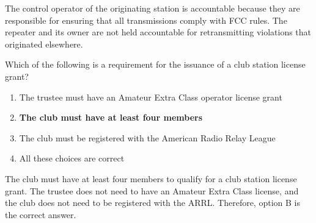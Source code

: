 The control operator of the originating station is accountable because they are responsible for ensuring that all transmissions comply with FCC rules. The repeater and its owner are not held accountable for retransmitting violations that originated elsewhere.

\begin{tcolorbox}[colback=gray!10!white,colframe=black!75!black,title={T1F11}]
    Which of the following is a requirement for the issuance of a club station license grant?
    \begin{enumerate}[label=\Alph*),noitemsep]
        \item The trustee must have an Amateur Extra Class operator license grant
        \item \textbf{The club must have at least four members}
        \item The club must be registered with the American Radio Relay League
        \item All these choices are correct
    \end{enumerate}
\end{tcolorbox}

The club must have at least four members to qualify for a club station license grant. The trustee does not need to have an Amateur Extra Class license, and the club does not need to be registered with the ARRL. Therefore, option B is the correct answer.
